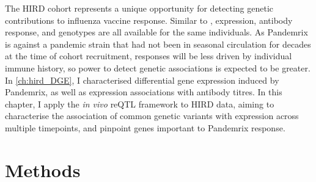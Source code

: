 The \gls{HIRD} cohort represents a unique opportunity for detecting genetic contributions to influenza vaccine response.
Similar to \textcite{franco2013IntegrativeGenomicAnalysis},
expression, antibody response, and genotypes are all available for the same individuals.
As Pandemrix is against a pandemic strain that had not been in seasonal circulation for decades at the time of cohort recruitment, 
responses will be less driven by individual immune history,
so power to detect genetic associations is expected to be greater.
In \cref{ch:hird_DGE}, I characterised differential gene expression induced by Pandemrix, as well as expression associations with antibody titres.
In this chapter, I apply the \textit{in vivo} \gls{reQTL} framework to \gls{HIRD} data, 
aiming to characterise the association of common genetic variants with expression across multiple timepoints,
and pinpoint genes important to Pandemrix response.

\section{Methods}

